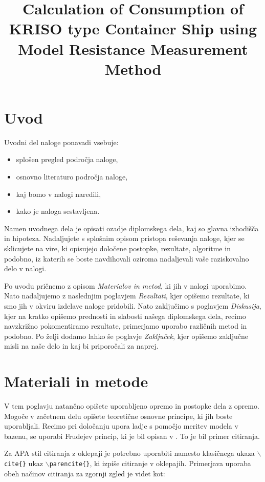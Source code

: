 \documentclass[pomnav, tisk]{fppthesis}
\title{Calculation of Consumption of KRISO type Container Ship using Model Resistance Measurement Method}
\begin{document}
\section{Uvod}
\label{sec:Uvod}

Uvodni del naloge ponavadi vsebuje:

\begin{itemize}[nosep]
	\item splošen pregled področja naloge,
	\item osnovno literaturo področja naloge,
	\item kaj bomo v nalogi naredili,
	\item kako je naloga sestavljena.
\end{itemize}

Namen uvodnega dela je opisati ozadje diplomskega dela, kaj so glavna izhodišča in hipoteza. Nadaljujete s splošnim opisom pristopa reševanja naloge, kjer se sklicujete na vire, ki opisujejo določene postopke, rezultate, algoritme in podobno, iz katerih se boste navdihovali oziroma nadaljevali vaše raziskovalno delo v nalogi.

Po uvodu pričnemo z opisom \textit{Materialov in metod}, ki jih v nalogi uporabimo. Nato nadaljujemo z naslednjim poglavjem \textit{Rezultati}, kjer opišemo rezultate, ki smo jih v okviru izdelave naloge pridobili. Nato zaključimo s poglavjem \textit{Diskusija}, kjer na kratko opišemo prednosti in slabosti našega diplomskega dela, recimo navzkrižno pokomentiramo rezultate, primerjamo uporabo različnih metod in podobno. Po želji dodamo lahko še poglavje \textit{Zaključek}, kjer opišemo zaključne misli na naše delo in kaj bi priporočali za naprej.


\newpage
\section{Materiali in metode}
\label{sec:Materiali}

V tem poglavju natančno opišete uporabljeno opremo in postopke dela z opremo. Mogoče v začetnem delu opišete teoretične osnovne principe, ki jih boste uporabljali. Recimo pri določanju upora ladje s pomočjo meritev modela v bazenu, se uporabi Frudejev princip, ki je bil opisan v \cite{froude1888resistance}. To je bil primer citiranja.

Za APA stil citiranja z oklepaji je potrebno uporabiti namesto klasičnega ukaza \texttt{$\backslash$cite\{\}} ukaz \texttt{$\backslash$parencite\{\}}, ki izpiše citiranje v oklepajih. Primerjava uporaba obeh načinov citiranja za zgornji zgled je videt kot:
\end{document}
